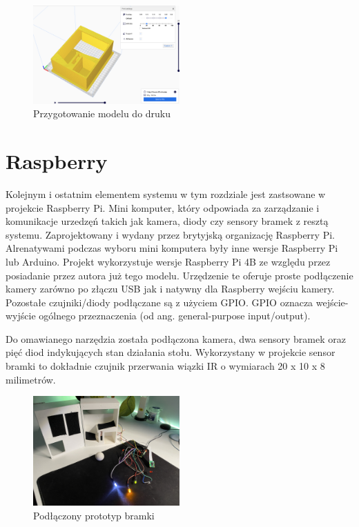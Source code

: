 \begin{figure}[h!]
  \centering
    \includegraphics[width=0.5\textwidth]{images/3D/cura_gate.png}
  \caption{Przygotowanie modelu do druku}
  \label{fig:mobile}
\end{figure}

\section{Raspberry}
Kolejnym i ostatnim elementem systemu w tym rozdziale jest zastsowane w projekcie Raspberry Pi. Mini komputer, który odpowiada za zarządzanie i komunikacje urzedzęń takich jak kamera, diody czy sensory bramek z resztą systemu. Zaprojektowany i wydany przez brytyjską organizację Raspberry Pi. Alrenatywami podczas wyboru mini komputera były inne wersje Raspberry Pi lub Arduino. Projekt wykorzystuje wersje Raspberry Pi 4B ze względu przez posiadanie przez autora już tego modelu. Urzędzenie te oferuje proste podłączenie kamery zarówno po złączu USB jak i natywny dla Raspberry wejściu kamery. Pozostałe czujniki/diody podłączane są z użyciem GPIO. GPIO oznacza wejście-wyjście ogólnego przeznaczenia (od ang. general-purpose input/output).

Do omawianego narzędzia została podłączona kamera, dwa sensory bramek oraz pięć diod indykujących stan działania stołu. Wykorzystany w projekcie sensor bramki to dokładnie czujnik przerwania wiązki IR o wymiarach 20 x 10 x 8 milimetrów.

\begin{figure}[h!]
  \centering
    \includegraphics[width=0.5\textwidth]{images/hardware/prototyp-bramki.jpg}
  \caption{Podłączony prototyp bramki}
  \label{fig:mobile}
\end{figure}